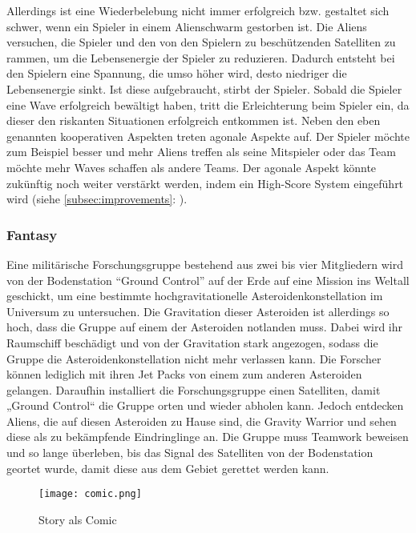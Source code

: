 \documentclass[11pt]{scrartcl}
\begin{document}
Allerdings ist eine Wiederbelebung nicht immer erfolgreich bzw. gestaltet sich schwer,
wenn ein Spieler in einem Alienschwarm gestorben ist. Die Aliens versuchen, die Spieler
und den von den Spielern zu beschützenden Satelliten zu rammen, um die Lebensenergie der Spieler zu reduzieren. Dadurch entsteht bei den Spielern eine Spannung, die umso höher wird, desto niedriger die Lebensenergie sinkt. Ist diese aufgebraucht, stirbt der Spieler. Sobald die Spieler eine Wave erfolgreich bewältigt haben, tritt die Erleichterung beim Spieler ein, da dieser den riskanten Situationen erfolgreich entkommen ist. Neben den eben genannten kooperativen Aspekten treten agonale Aspekte auf. Der Spieler möchte zum Beispiel besser und mehr Aliens treffen als seine Mitspieler oder das Team möchte mehr Waves schaffen als andere Teams. Der agonale Aspekt könnte zukünftig noch weiter verstärkt werden, indem ein High-Score System eingeführt wird (siehe \autoref{subsec:improvements}: ). 

\newpage
\subsubsection{Fantasy}
\label{subsec:fan}
Eine militärische Forschungsgruppe bestehend aus zwei bis vier Mitgliedern wird von der
Bodenstation “Ground Control” auf der Erde auf eine Mission ins Weltall geschickt, um eine
bestimmte hochgravitationelle Asteroidenkonstellation im Universum zu untersuchen. Die
Gravitation dieser Asteroiden ist allerdings so hoch, dass die Gruppe auf einem der
Asteroiden notlanden muss. Dabei wird ihr Raumschiff beschädigt und von der Gravitation
stark angezogen, sodass die Gruppe die Asteroidenkonstellation nicht mehr verlassen kann.
Die Forscher können lediglich mit ihren Jet Packs von einem zum anderen Asteroiden
gelangen. Daraufhin installiert die Forschungsgruppe einen Satelliten, damit „Ground
Control“ die Gruppe orten und wieder abholen kann. Jedoch entdecken Aliens, die auf diesen
Asteroiden zu Hause sind, die Gravity Warrior und sehen diese als zu bekämpfende Eindringlinge an. Die Gruppe muss Teamwork beweisen und so lange überleben, bis das Signal des Satelliten von der Bodenstation geortet wurde, damit diese aus dem Gebiet gerettet werden kann. 

\begin{figure}[htp]
	\centering
	\texttt{[image: comic.png]}
	\caption{Story als Comic}
	\label{fig:comic}
\end{figure}
\end{document}
